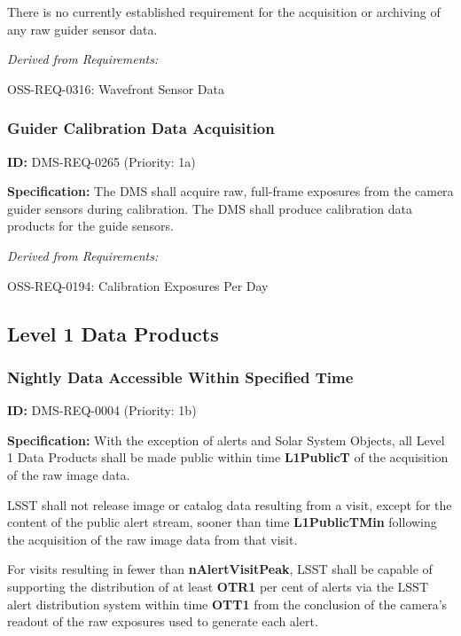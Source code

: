 \documentclass[SE,toc,lsstdraft]{lsstdoc}
\begin{document}
There is no currently established requirement for the acquisition or archiving of any raw guider sensor data.

\emph{Derived from Requirements:}

OSS-REQ-0316:
Wavefront Sensor Data \newline

\subsubsection{Guider Calibration Data Acquisition}

\label{DMS-REQ-0265}
\textbf{ID:} DMS-REQ-0265 (Priority: 1a)

\textbf{Specification:} The DMS shall acquire raw, full-frame exposures from the camera guider sensors during calibration. The DMS shall produce calibration data products for the guide sensors.

\emph{Derived from Requirements:}

OSS-REQ-0194:
Calibration Exposures Per Day \newline

\subsection{Level 1 Data Products}

\subsubsection{Nightly Data Accessible Within Specified Time}

\label{DMS-REQ-0004}
\textbf{ID:} DMS-REQ-0004 (Priority: 1b)

\textbf{Specification:}
With the exception of alerts and Solar System Objects, all Level 1 Data Products shall be made public within time \textbf{L1PublicT} of the acquisition of the raw image data.

LSST shall not release image or catalog data resulting from a visit, except for the content of the public alert stream, sooner than time \textbf{L1PublicTMin} following the acquisition of the raw image data from that visit.

For visits resulting in fewer than \textbf{nAlertVisitPeak}, LSST shall be capable of supporting the distribution of at least \textbf{OTR1} per cent of alerts via the LSST alert distribution system within time \textbf{OTT1} from the conclusion of the camera's readout of the raw exposures used to generate each alert.
\end{document}
